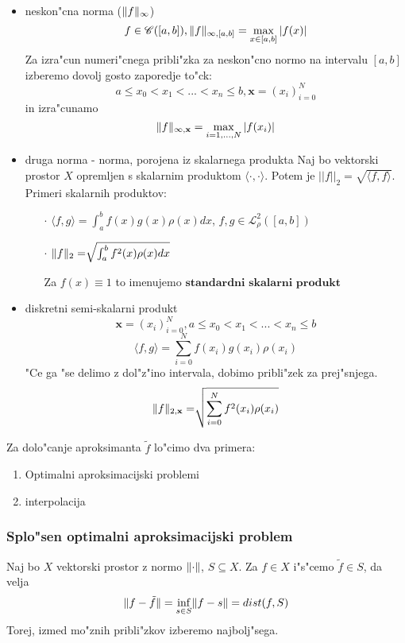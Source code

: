 \documentclass[a4paper,12pt]{article}
\DeclarePairedDelimiter\norm{\lVert}{\rVert}
\newcommand{\innerproduct}[2]{\langle #1, #2 \rangle}
\theoremstyle{definition}
\theoremstyle{remark}
\begin{document}
\begin{itemize}
    \item neskon"cna norma ($\norm{f}_{\infty}$)
    \[f \in \mathscr{C}([a, b]), \norm{f}_{\infty, [a, b]} = \max_{x \in [a, b]} |f(x)|\]
    Za izra"cun numeri"cnega pribli"zka za neskon"cno normo na intervalu $[a, b]$ izberemo dovolj gosto zaporedje to"ck:
    \[a \leq x_0 < x_1 < ... < x_n \leq b, \textbf{x} = (x_i)_{i=0}^N\]
    in izra"cunamo
    \[\norm{f}_{\infty, \textbf{x}} = \max_{i = 1, \dots, N} |f(x_i)|\]
    \item druga norma - norma, porojena iz skalarnega produkta
    Naj bo vektorski prostor $X$ opremljen s skalarnim produktom $\innerproduct{\cdot}{\cdot}$. Potem je $||f||_2 = \sqrt{\innerproduct{f}{f}}$.
    Primeri skalarnih produktov:
    \begin{enumerate}
        \item[$\cdot$] $\innerproduct{f}{g} = \int_{a}^{b} f(x) g(x) \rho(x) dx$, $f, g \in \mathscr{L}_{\rho}^2 ([a, b])$
        \item[$\cdot$] $\norm{f}_2 = \sqrt[]{\int_{a}^{b} f^2(x)\rho(x)dx }$
        
        Za $f(x) \equiv 1$ to imenujemo $\textbf{standardni skalarni produkt}$
    \end{enumerate}
    \item diskretni semi-skalarni produkt
    \[\textbf{x} = (x_i)_{i=0}^N, a \leq x_0 < x_1 < ... < x_n \leq b\]
    \[\innerproduct{f}{g} = \sum_{i = 0}^{N} f(x_i) g(x_i) \rho(x_i)\]
    "Ce ga "se delimo z dol"z"ino intervala, dobimo pribli"zek za prej"snjega.
    \[\norm{f}_{2, \textbf{x}} = \sqrt[]{\sum_{i = 0}^{N} f^2(x_i)\rho(x_i)}\]
\end{itemize}


Za dolo"canje aproksimanta $\tilde{f}$ lo"cimo dva primera:
\begin{enumerate}
    \item Optimalni aproksimacijski problemi
    \item interpolacija
\end{enumerate}

\subsubsection{Splo"sen optimalni aproksimacijski problem}
Naj bo $X$ vektorski prostor z normo $\norm{\cdot}$, $S \subseteq X$. Za $f \in X$ i"s"cemo $\tilde{f} \in S$, da velja
\begin{equation}
    \norm{f - \tilde{f}} = \inf_{s \in S} \norm{f - s} = dist(f, S)
\end{equation}
Torej, izmed mo"znih pribli"zkov izberemo najbolj"sega.
\end{document}
